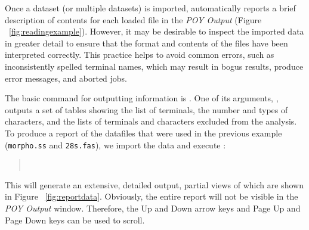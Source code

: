 Once a dataset (or multiple datasets) is imported, \poy automatically reports a brief description of contents for each loaded file in the \emph{POY Output} (Figure ~\ref{fig:readingexample}). However, it may be desirable to inspect the imported data in greater detail to ensure that the format and contents of the files have been interpreted correctly. This practice helps to avoid common errors, such as inconsistently spelled terminal names, which may result in bogus results, produce error messages, and aborted jobs.

The basic command for outputting information is . One of its arguments, , outputs a set of tables showing the list of terminals, the number and types of characters, and the lists of terminals and characters excluded from the analysis. To produce a report of the datafiles that were used in the previous example (\texttt{morpho.ss} and \texttt{28s.fas}), we import the data and execute :
\begin{quote}
    \\
\end{quote}
This will generate an extensive, detailed output, partial views of which are shown in Figure ~\ref{fig:reportdata}. Obviously, the entire report will not be visible in the \emph{POY Output} window. Therefore, the Up and Down arrow keys and Page Up and Page Down keys can be used to scroll.

